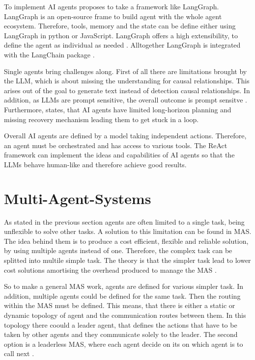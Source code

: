 \documentclass[a4paper,oneside,bibliography=totoc]{scrbook}
\begin{document}
To implement \ac{AI} agents \citet{Anthropic2024} proposes to take a framework like LangGraph. LangGraph is an open-source frame to build agent with the whole agent ecosystem. Therefore, tools, memory and the state can be define either using LangGraph in python or JavaScript. LangGraph offers a high extensibility, to define the agent as individual as needed \cite{LangChain2025}. Alltogether LangGraph is integrated with the LangChain package \cite{LangChain2025a}.

Single agents bring challenges along. First of all there are limitations brought by the \ac{LLM}, which is about missing the understanding for causal relationships. This arises out of the goal to generate text instead of detection causal relationships. In addition, as \acp{LLM} are prompt sensitive, the overall outcome is prompt sensitve \cite{Sapkota2025}. Furthermore, \citet{Sapkota2025} states, that \ac{AI} agents have limited long-horizon planning and missing recovery mechanism leading them to get stuck in a loop.

Overall \ac{AI} agents are defined by a model taking independent actions. Therefore, an agent must be orchestrated and has access to various tools. The ReAct framework can implement the ideas and capabilities of \ac{AI} agents so that the \acp{LLM} behave human-like and therefore achieve good results.

\section{Multi-Agent-Systems}
\label{sec:multi_agent_systems}

As stated in the previous section agents are often limited to a single task, being unflexible to solve other tasks. A solution to this limitation can be found in \ac{MAS}. The idea behind them is to produce a cost efficient, flexible and reliable solution, by using multiple agents instead of one. Therefore, the complex task can be splitted into multile simple task. The theory is that the simpler task lead to lower cost solutions amortising the overhead produced to manage the \ac{MAS} \cite{Dorri2018}.

So to make a general \ac{MAS} work, agents are defined for various simpler task. In addition, multiple agents could be defined for the same task. Then the routing within the \ac{MAS} must be defined. This means, that there is either a static or dynamic topology of agent and the communication routes between them. In this topology there coould a leader agent, that defines the actions that have to be taken by other agents and they communicate solely to the leader. The second option is a leaderless \ac{MAS}, where each agent decide on its on which agent is to call next \cite{Dorri2018}.
\end{document}
